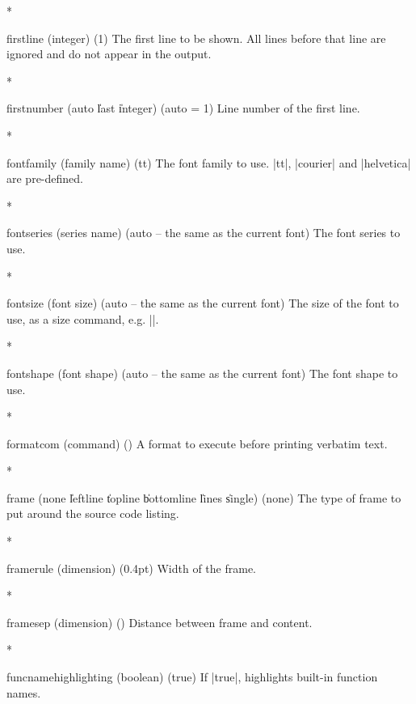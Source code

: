 \begin{paracol}{2}
\begin{optionlist}
\switchcolumn[0]*%
  \item[firstline (integer) (1)]
    The first line to be shown.
    All lines before that line are ignored and do not appear in the output.
    \switchcolumn

\switchcolumn[0]*%
  \item[firstnumber (auto \| last \| integer) (auto = 1)]
    Line number of the first line.
    \switchcolumn

\switchcolumn[0]*%
  \item[fontfamily (family name) (tt)]
    The font family to use.
    |tt|, |courier| and |helvetica| are pre-defined.
    \switchcolumn

\switchcolumn[0]*%
  \item[fontseries (series name) (auto \textrm{-- the same as the current font})]
    The font series to use.
    \switchcolumn

\switchcolumn[0]*%
  \item[fontsize (font size) (auto \textrm{-- the same as the current font})]
    The size of the font to use, as a size command, e.g. |\footnotesize|.
    \switchcolumn

\switchcolumn[0]*%
  \item[fontshape (font shape) (auto \textrm{-- the same as the current font})]
    The font shape to use.
    \switchcolumn

\switchcolumn[0]*%
  \item[formatcom (command) (\meta{none})]
    A format to execute before printing verbatim text.
    \switchcolumn

\switchcolumn[0]*%
  \item[frame (none \| leftline \| topline \| bottomline \| lines \| single) (none)]
    The type of frame to put around the source code listing.
    \switchcolumn

\switchcolumn[0]*%
  \item[framerule (dimension) (0.4pt)]
    Width of the frame.
    \switchcolumn

\switchcolumn[0]*%
  \item[framesep (dimension) (\cmd\fboxsep)]
    Distance between frame and content.
    \switchcolumn

\switchcolumn[0]*%
  \item[funcnamehighlighting (boolean) (true)] 
    If |true|, highlights built-in function names.
    \switchcolumn


\end{optionlist}
\end{paracol}
